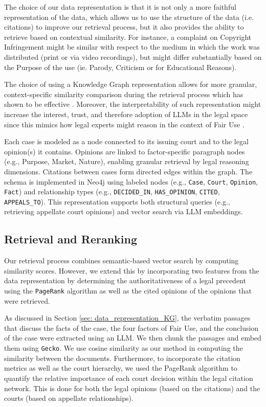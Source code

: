 The choice of our data representation is that it is not only a more faithful representation of the data, which allows us to use the structure of the data (i.e. citations) to improve our retrieval process, but it also provides the ability to retrieve based on contextual similarity. For instance, a complaint on Copyright Infringement might be similar with respect to the medium in which the work was distributed (print or via video recordings), but might differ substantially based on the Purpose of the use (ie. Parody, Criticism or for Educational Reasons). 

The choice of using a Knowledge Graph representation allows for more granular, context-specific similarity comparison during the retrieval process which has shown to be effective \cite{02_DenseRetrieval, 03b_SemanticRepresentationContextual}. Moreover, the interpretability of such representation might increase the interest, trust, and therefore adoption of LLMs in the legal space since this mimics how legal experts might reason in the context of Fair Use \cite{18_TrustAIExplainability}.

Each case is modeled as a node connected to its issuing court and to the legal opinion(s) it contains. Opinions are linked to factor-specific paragraph nodes (e.g., Purpose, Market, Nature), enabling granular retrieval by legal reasoning dimensions. Citations between cases form directed edges within the graph. The schema is implemented in Neo4j using labeled nodes (e.g., \texttt{Case}, \texttt{Court}, \texttt{Opinion}, \texttt{Fact}) and relationship types (e.g., \texttt{DECIDED\_IN}, \texttt{HAS\_OPINION}, \texttt{CITED}, \texttt{APPEALS\_TO}). This representation supports both structural queries (e.g., retrieving appellate court opinions) and vector search via LLM embeddings.

\subsection{Retrieval and Reranking}

Our retrieval process combines semantic-based vector search by computing similarity scores. However, we extend this by incorporating two features from the data representation by determining the authoritativeness of a legal precedent using the \texttt{PageRank} algorithm as well as the cited opinions of the opinions that were retrieved.

As discussed in Section \ref{sec: data_representation_KG}, the verbatim passages that discuss the facts of the case, the four factors of Fair Use, and the conclusion of the case were extracted using an LLM. We then chunk the passages and embed them using \texttt{Gecko}. We use cosine similarity as our method in computing the similarity between the documents. Furthermore, to incorporate the citation metrics as well as the court hierarchy, we used the PageRank algorithm to quantify the relative importance of each court decision within the legal citation network. This is done for both the legal opinions (based on the citations) and the courts (based on appellate relationships). 

